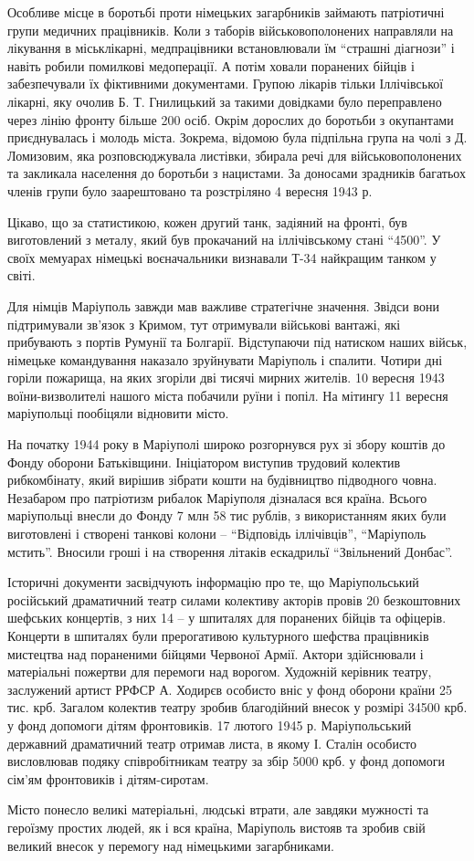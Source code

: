 Особливе місце в боротьбі проти німецьких загарбників займають патріотичні
групи медичних працівників. Коли з таборів військовополонених направляли на
лікування в міськлікарні, медпрацівники встановлювали їм \enquote{страшні діагнози} і
навіть робили помилкові медоперації. А потім ховали поранених бійців і
забезпечували їх фіктивними документами. Групою лікарів тільки Іллічівської
лікарні, яку очолив Б. Т. Гнилицький за такими довідками було переправлено через
лінію фронту більше 200 осіб. Окрім дорослих до боротьби з окупантами
приєднувалась і молодь міста. Зокрема, відомою була підпільна група на чолі з
Д. Ломизовим, яка розповсюджувала листівки, збирала речі для військовополонених
та закликала населення до боротьби з нацистами. За доносами зрадників  багатьох
членів групи було заарештовано та розстріляно 4 вересня 1943 р. 

Цікаво, що за статистикою, кожен другий танк, задіяний на фронті, був
виготовлений з металу, який був прокачаний на іллічівському стані \enquote{4500}. У
своїх мемуарах німецькі воєначальники визнавали Т-34 найкращим танком у світі.


Для німців Маріуполь завжди мав важливе стратегічне значення. Звідси вони
підтримували зв'язок з Кримом, тут отримували військові вантажі, які прибувають
з портів Румунії та Болгарії. Відступаючи під натиском наших військ, німецьке
командування наказало зруйнувати Маріуполь і спалити. Чотири дні горіли
пожарища, на яких згоріли дві тисячі мирних жителів. 10 вересня 1943
воїни-визволителі нашого міста побачили руїни і попіл. На мітингу 11 вересня
маріупольці пообіцяли відновити місто.

На початку 1944 року в Маріуполі широко розгорнувся рух зі збору коштів до
Фонду оборони Батьківщини. Ініціатором виступив трудовий колектив рибкомбінату,
який вирішив зібрати кошти на будівництво підводного човна. Незабаром про
патріотизм рибалок Маріуполя дізналася вся країна. Всього маріупольці внесли до
Фонду 7 млн 58 тис рублів, з використанням яких були виготовлені і створені
танкові колони – \enquote{Відповідь іллічівців}, \enquote{Маріуполь мстить}.
Вносили гроші і на створення літаків ескадрильї \enquote{Звільнений Донбас}.

Історичні документи засвідчують інформацію про те, що Маріупольський російський
драматичний театр силами колективу акторів провів 20 безкоштовних шефських
концертів, з них 14 – у шпиталях для поранених бійців та офіцерів. Концерти в
шпиталях були прерогативою культурного шефства працівників мистецтва над
пораненими бійцями Червоної Армії. Актори здійснювали і матеріальні пожертви
для перемоги над ворогом. Художній керівник театру, заслужений артист РРФСР А.
Ходирєв особисто вніс у фонд оборони країни 25 тис. крб. Загалом колектив
театру зробив благодійний внесок у розмірі 34500 крб. у фонд допомоги дітям
фронтовиків. 17 лютого 1945 р. Маріупольський державний драматичний театр
отримав листа, в якому І. Сталін особисто висловлював подяку співробітникам
театру за збір 5000 крб. у фонд допомоги сім'ям фронтовиків і дітям-сиротам.

Місто понесло великі матеріальні, людські втрати, але завдяки мужності та
героїзму простих людей, як і вся країна, Маріуполь вистояв та зробив свій
великий внесок у перемогу над німецькими загарбниками.

